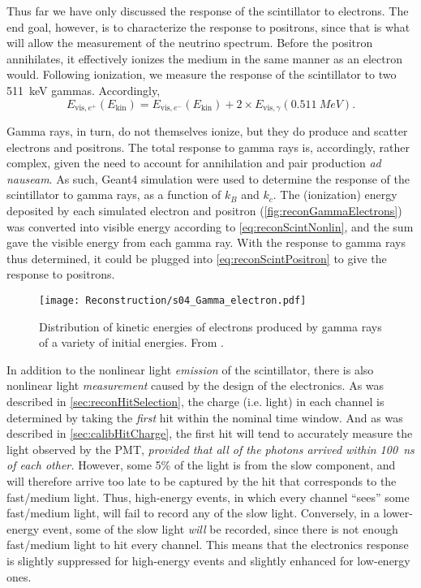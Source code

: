 \documentclass[../thesis.tex]{subfiles}
\begin{document}
Thus far we have only discussed the response of the scintillator to electrons. The end goal, however, is to characterize the response to positrons, since that is what will allow the measurement of the neutrino spectrum. Before the positron annihilates, it effectively ionizes the medium in the same manner as an electron would. Following ionization, we measure the response of the scintillator to two 511~keV gammas. Accordingly,
\begin{equation}
  \label{eq:reconScintPositron}
  E_{\mathrm{vis},e^+}(E_{\mathrm{kin}}) = E_{\mathrm{vis},e^-}(E_{\mathrm{kin}}) + 2 \times E_{\mathrm{vis},\gamma}(\SI{0.511}{MeV}).
\end{equation}

Gamma rays, in turn, do not themselves ionize, but they do produce and scatter electrons and positrons. The total response to gamma rays is, accordingly, rather complex, given the need to account for annihilation and pair production \emph{ad nauseam}. As such, Geant4 simulation were used to determine the response of the scintillator to gamma rays, as a function of $k_B$ and $k_c$. The (ionization) energy deposited by each simulated electron and positron (\autoref{fig:reconGammaElectrons}) was converted into visible energy according to \eqref{eq:reconScintNonlin}, and the sum gave the visible energy from each gamma ray. With the response to gamma rays thus determined, it could be plugged into \eqref{eq:reconScintPositron} to give the response to positrons.

\begin{figure}[h]
  \texttt{[image: Reconstruction/s04\_Gamma\_electron.pdf]}
  \caption{Distribution of kinetic energies of electrons produced by gamma rays of a variety of initial energies. From \cite{NonlinearityPaper}.}
  \label{fig:reconGammaElectrons}
\end{figure}

In addition to the nonlinear light \emph{emission} of the scintillator, there is also nonlinear light \emph{measurement} caused by the design of the electronics. As was described in \autoref{sec:reconHitSelection}, the charge (i.e. light) in each channel is determined by taking the \emph{first} hit within the nominal time window. And as was described in \autoref{sec:calibHitCharge}, the first hit will tend to accurately measure the light observed by the PMT, \emph{provided that all of the photons arrived within 100~ns of each other.} However, some 5\% of the light is from the slow component, and will therefore arrive too late to be captured by the hit that corresponds to the fast/medium light. Thus, high-energy events, in which every channel ``sees'' some fast/medium light, will fail to record any of the slow light. Conversely, in a lower-energy event, some of the slow light \emph{will} be recorded, since there is not enough fast/medium light to hit every channel. This means that the electronics response is slightly suppressed for high-energy events and slightly enhanced for low-energy ones.
\end{document}

